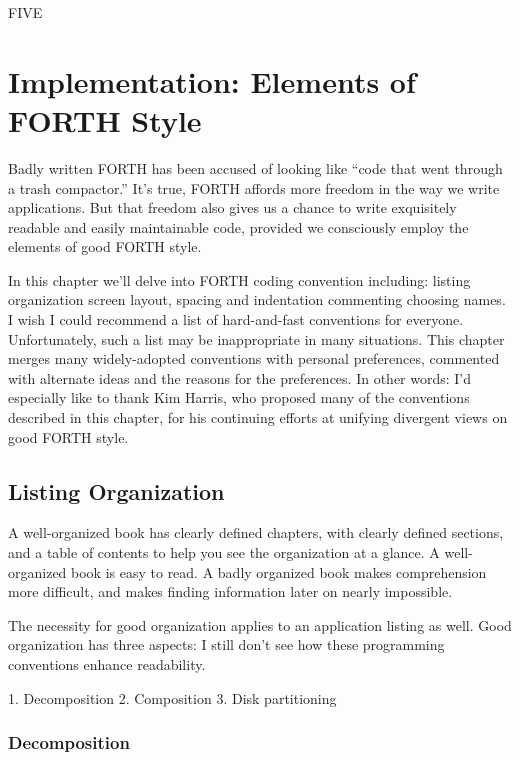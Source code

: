 
FIVE

\chapter{
Implementation:
Elements of FORTH Style
}

Badly written FORTH has been accused of looking like ``code that went
through a trash compactor.'' It's true, FORTH affords more freedom in
the way we write applications.  But that freedom also gives us a chance to
write exquisitely readable and easily maintainable code, provided we consciously
employ the elements of good FORTH style.

In this chapter we'll delve into FORTH coding convention
including:
listing organization
screen layout, spacing and indentation
commenting
choosing names.
I wish I could recommend a list of hard-and-fast conventions for
everyone.  Unfortunately, such a list may be inappropriate in many situations.
This chapter merges many widely-adopted conventions with personal
preferences, commented with alternate ideas and the reasons for
the preferences.  In other words:
I'd especially like to thank Kim Harris, who proposed many of the conventions
described in this chapter, for his continuing efforts at unifying
divergent views on good FORTH style.

\section{Listing Organization}

A well-organized book has clearly defined chapters, with clearly defined
sections, and a table of contents to help you see the organization at a
glance.  A well-organized book is easy to read.  A badly organized book
makes comprehension more difficult, and makes finding information
later on nearly impossible.

The necessity for good organization applies to an application listing
as well.  Good organization has three aspects:
I still don't see how these programming conventions enhance readability.

1. Decomposition
2. Composition
3. Disk partitioning
\subsection{Decomposition}

